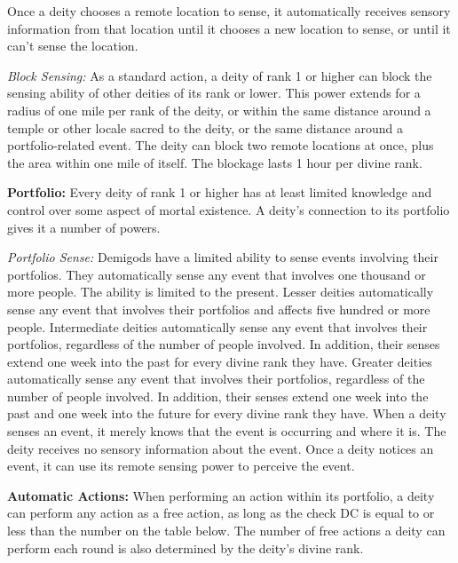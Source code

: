 \documentclass{article}
\begin{document}
\vspace{12pt}
Once a deity chooses a remote location to sense, it automatically receives sensory 
information from that location until it chooses a new location to sense, or until 
it can't sense the location.

\textit{Block Sensing: }As a standard action, a deity of rank 1 or higher can block 
the sensing ability of other deities of its rank or lower. This power extends for 
a radius of one mile per rank of the deity, or within the same distance around 
a temple or other locale sacred to the deity, or the same distance around a portfolio-related 
event. The deity can block two remote locations at once, plus the area within one 
mile of itself. The blockage lasts 1 hour per divine rank.

\vspace{12pt}
\textbf{Portfolio: }Every deity of rank 1 or higher has at least limited knowledge 
and control over some aspect of mortal existence. A deity's connection to its portfolio 
gives it a number of powers.

\textit{Portfolio Sense: }Demigods have a limited ability to sense events involving 
their portfolios. They automatically sense any event that involves one thousand 
or more people. The ability is limited to the present. Lesser deities automatically 
sense any event that involves their portfolios and affects five hundred or more 
people. Intermediate deities automatically sense any event that involves their 
portfolios, regardless of the number of people involved. In addition, their senses 
extend one week into the past for every divine rank they have. Greater deities 
automatically sense any event that involves their portfolios, regardless of the 
number of people involved. In addition, their senses extend one week into the past 
and one week into the future for every divine rank they have. When a deity senses 
an event, it merely knows that the event is occurring and where it is. The deity 
receives no sensory information about the event. Once a deity notices an event, 
it can use its remote sensing power to perceive the event.

\vspace{12pt}
\textbf{Automatic Actions: }When performing an action within its portfolio, a deity 
can perform any action as a free action, as long as the check DC is equal to or 
less than the number on the table below. The number of free actions a deity can 
perform each round is also determined by the deity's divine rank.
\end{document}
